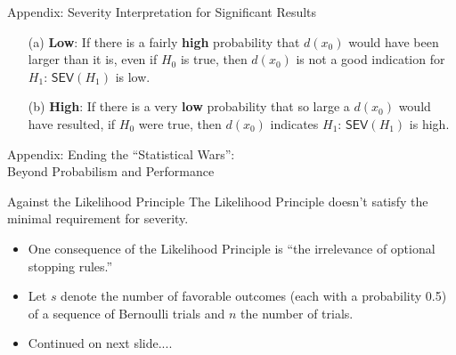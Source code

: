 \documentclass{beamer}
\begin{document}
\begin{frame}{Appendix: Severity Interpretation for Significant Results}
\begin{enumerate}
\item[(a)] \textbf{Low}: If there is a fairly \textbf{high} probability that $d(x_{0})$ would have been larger than it is, even if $H_{0}$ is true, then $d(x_{0})$ is not a good indication for $H_{1}$: $\textsf{SEV}(H_{1})$ is low.
\item[(b)] \textbf{High}: If there is a very \textbf{low} probability that so large a $d(x_{0})$ would have resulted, if $H_{0}$ were true, then $d(x_{0})$ indicates $H_{1}$: $\textsf{SEV}(H_{1})$ is high.
\end{enumerate}

\end{frame}



\begin{frame}{Appendix: Ending the ``Statistical Wars'':\\Beyond Probabilism and Performance}
\begin{block}{Against the Likelihood Principle}
The Likelihood Principle doesn't satisfy the minimal requirement for severity.
\end{block}
\begin{itemize}

\item One consequence of the Likelihood Principle is ``the irrelevance of optional stopping rules.''

\item Let $s$ denote the number of favorable outcomes (each with a probability 0.5) of a sequence of Bernoulli trials and $n$ the number of trials.

\item Continued on next slide....

\end{itemize}
\end{frame}
\end{document}
